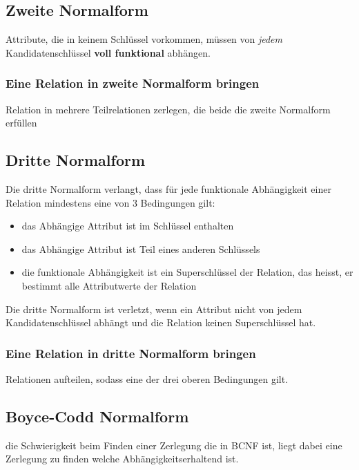 \subsection{Zweite Normalform}

Attribute, die in keinem Schlüssel vorkommen, müssen von \textit{jedem} Kandidatenschlüssel \textbf{voll funktional} abhängen.

\subsubsection{Eine Relation in zweite Normalform bringen}

Relation in mehrere Teilrelationen zerlegen, die beide die zweite Normalform erfüllen

\subsection{Dritte Normalform}

Die dritte Normalform verlangt, dass für jede funktionale Abhängigkeit einer Relation mindestens eine von 3 Bedingungen gilt:
\begin{itemize}
    \item das Abhängige Attribut ist im Schlüssel enthalten
    \item das Abhängige Attribut ist Teil eines anderen Schlüssels
    \item die funktionale Abhängigkeit ist ein Superschlüssel der Relation, das heisst, er bestimmt alle Attributwerte der Relation
\end{itemize}

Die dritte Normalform ist verletzt, wenn ein Attribut nicht von jedem Kandidatenschlüssel abhängt und die Relation keinen Superschlüssel hat.

\subsubsection{Eine Relation in dritte Normalform bringen}

Relationen aufteilen, sodass eine der drei oberen Bedingungen gilt.

\subsection{Boyce-Codd Normalform}

die Schwierigkeit beim Finden einer Zerlegung die in BCNF ist, liegt dabei eine Zerlegung zu finden welche Abhängigkeitserhaltend ist.

